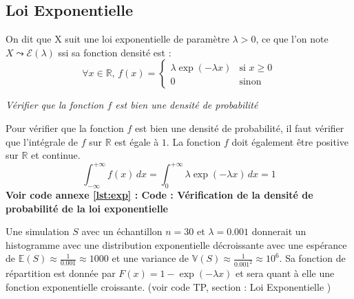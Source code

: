     \subsection{Loi Exponentielle}
        On dit que X suit une loi exponentielle de paramètre $\lambda >0$, ce que l’on note $X\leadsto \mathcal E(\lambda)$ ssi sa fonction densité est : 
        \begin{equation}
            \forall x\in \mathbb R,\,f(x)=\left \lbrace 
            \begin{array}{cl}
                \lambda \exp(-\lambda x) & \text{si } x \geq 0 \\
                0 & \text {sinon}
                \end{array} \right.
            \label{eq:exp}
        \end{equation}

        \begin{center}
            \textit{Vérifier que la fonction $f$ est bien une densité de probabilité}
        \end{center}

        Pour vérifier que la fonction $f$ est bien une densité de probabilité, il faut vérifier que l'intégrale de $f$ sur $\mathbb R$ est égale à $1$.  La fonction $f$ doit également être positive sur $\mathbb R$ et continue.
        \[
            \int_{-\infty}^{+\infty} f(x)\,dx = \int_{0}^{+\infty} \lambda \exp(-\lambda x)\,dx = 1
        \]
        \textbf{Voir code annexe \ref{lst:exp} : Code : Vérification de la densité de probabilité de la loi exponentielle}

        Une simulation $S$ avec un échantillon $n=30$ et $\lambda = 0.001$ donnerait un histogramme avec une distribution exponentielle décroissante avec une espérance de $\mathbb{E}(S) \approx \frac{1}{0.001} \approx 1000$ et une variance de $\mathbb{V}(S) \approx \frac{1}{0.001^2} \approx 10^6$.
        Sa fonction de répartition est donnée par $F(x) = 1-\exp(-\lambda x)$ et sera quant à elle une fonction exponentielle croissante. (voir code TP, section : Loi Exponentielle \cite{TP})

\newpage